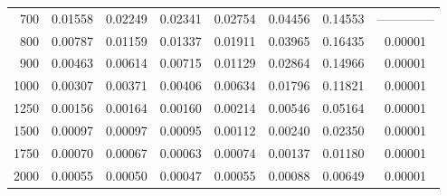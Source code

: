 \begin{table}[ht]
\begin{tabular}{r|c|c|c|c|c|c|c}
      700 & 0.01558 & 0.02249 & 0.02341 & 0.02754 & 0.04456 & 0.14553 & -------------- \\
      800 & 0.00787 & 0.01159 & 0.01337 & 0.01911 & 0.03965 & 0.16435 & 0.00001 \\
      900 & 0.00463 & 0.00614 & 0.00715 & 0.01129 & 0.02864 & 0.14966 & 0.00001 \\
     1000 & 0.00307 & 0.00371 & 0.00406 & 0.00634 & 0.01796 & 0.11821 & 0.00001 \\
     1250 & 0.00156 & 0.00164 & 0.00160 & 0.00214 & 0.00546 & 0.05164 & 0.00001 \\
     1500 & 0.00097 & 0.00097 & 0.00095 & 0.00112 & 0.00240 & 0.02350 & 0.00001 \\
     1750 & 0.00070 & 0.00067 & 0.00063 & 0.00074 & 0.00137 & 0.01180 & 0.00001 \\
     2000 & 0.00055 & 0.00050 & 0.00047 & 0.00055 & 0.00088 & 0.00649 & 0.00001 \\ \cline{1-8}
    \end{tabular}
    \label{tab:XRayEffOE2}
\end{table}

